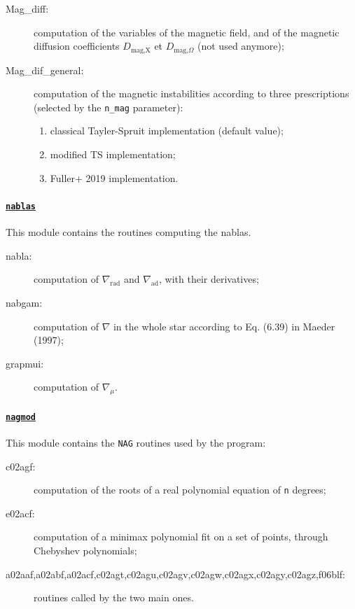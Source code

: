 \documentclass[11pt]{article}
\begin{document}
\begin{description}
 \item[Mag\_diff:] computation of the variables of the magnetic field, and of the magnetic diffusion coefficients $D_\text{mag,X}$ et $D_{\text{mag,}\Omega}$ (not used anymore);
 \item[Mag\_dif\_general:] computation of the magnetic instabilities according to three prescriptions (selected by the \texttt{n\_mag} parameter):
 \begin{enumerate}[labelindent=.5cm,font=\ttfamily \bfseries,label=\arabic*:]
   \item classical Tayler-Spruit implementation (default value);
   \item modified TS implementation;
   \item Fuller+ 2019 implementation.
 \end{enumerate}
\end{description}

\paragraph{\underline{\texttt{nablas}}}
This module contains the routines computing the nablas.

\begin{description}
 \item[nabla:] computation of $\nabla_\text{rad}$ and $\nabla_\text{ad}$, with their derivatives;
 \item[nabgam:] computation of $\nabla$ in the whole star according to Eq. (6.39) in Maeder (1997);
 \item[grapmui:] computation of $\nabla_\mu$.
 \end{description}

\paragraph{\underline{\texttt{nagmod}}}
This module contains the {\tt NAG} routines used by the program:

\begin{description}
 \item[c02agf:] computation of the roots of a real polynomial equation of {\tt n} degrees;
 \item[e02acf:] computation of a minimax polynomial fit on a set of points, through Chebyshev polynomials;
 \item[a02aaf,a02abf,a02acf,c02agt,c02agu,c02agv,c02agw,c02agx,c02agy,c02agz,f06blf:] routines called by the two main ones.
 \end{description}
\end{document}
